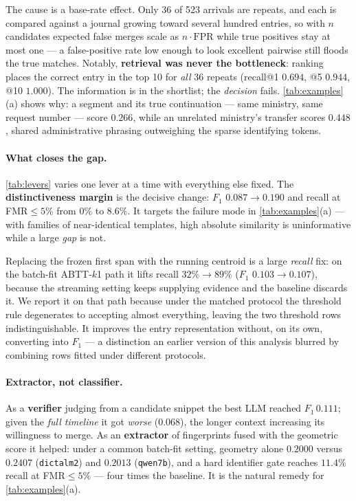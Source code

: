 \documentclass[11pt]{article}
\begin{document}
The cause is a base-rate effect. Only 36 of 523 arrivals are repeats, and each is compared
against a journal growing toward several hundred entries, so with $n$ candidates expected
false merges scale as $n\cdot\mathrm{FPR}$ while true positives stay at most one --- a
false-positive rate low enough to look excellent pairwise still floods the true matches.
Notably, \textbf{retrieval was never the bottleneck}: ranking places the correct entry in the
top 10 for \emph{all} 36 repeats (recall@1 $0.694$, @5 $0.944$, @10 $1.000$). The information
is in the shortlist; the \emph{decision} fails. \cref{tab:examples}(a) shows why: a segment
and its true continuation --- same ministry, same request number --- score $0.266$, while an
unrelated ministry's transfer scores $0.448$, shared administrative phrasing outweighing the
sparse identifying tokens.

\paragraph{What closes the gap.}
\label{sec:centroid}
\cref{tab:levers} varies one lever at a time with everything else fixed. The
\textbf{distinctiveness margin} is the decisive change: $F_1$ $0.087\to0.190$ and recall at
FMR$\le5\%$ from $0\%$ to $8.6\%$. It targets the failure mode in
\cref{tab:examples}(a) --- with families of near-identical templates, high absolute
similarity is uninformative while a large \emph{gap} is not.

Replacing the frozen first span with the running centroid is a large \emph{recall} fix: on
the batch-fit ABTT-$k$1 path it lifts recall $32\%\to89\%$ ($F_1$ $0.103\to0.107$), because
the streaming setting keeps supplying evidence and the baseline discards it. We report it on
that path because under the matched protocol the threshold rule degenerates to accepting
almost everything, leaving the two threshold rows indistinguishable. It improves the entry
representation without, on its own, converting into $F_1$ --- a distinction an earlier
version of this analysis blurred by combining rows fitted under different protocols.

\paragraph{Extractor, not classifier.}
As a \textbf{verifier} judging from a candidate snippet the best LLM reached $F_1\,0.111$;
given the \emph{full timeline} it got \emph{worse} ($0.068$), the longer context increasing
its willingness to merge. As an \textbf{extractor} of fingerprints fused with the geometric
score it helped: under a common batch-fit setting, geometry alone $0.2000$ versus $0.2407$
(\texttt{dictalm2}) and $0.2013$ (\texttt{qwen7b}), and a hard identifier gate reaches
$11.4\%$ recall at FMR$\le5\%$ --- four times the baseline. It is the natural remedy for
\cref{tab:examples}(a).
\end{document}
